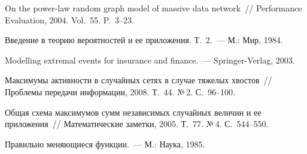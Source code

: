 \begin{multicols}{2}
{{\begin{thebibliography}{9}
     On the power-law random graph model
    of massive data network~// Performance Evaluation, 2004. Vol.~55. P.~3--23.

     Введение в теорию вероятностей и ее приложения. Т.~2.~---
    М.: Мир, 1984.

     Modelling
    extremal events for insurance and finance.~--- Springer-Verlag, 2003.

     Максимумы активности в случайных сетях в
    случае тяжелых хвостов~// Проблемы передачи информации, 2008. Т.~44.
    №\,2. С.~96--100.

 Общая схема максимумов сумм независимых
    случайных величин и ее приложения~// Математические заметки, 2005.
    Т.~77. №\,4. С.~544--550.

\label{end\stat}

 Правильно меняющиеся функции.~--- М.: Наука, 1985.
 \end{thebibliography}
}
}


\end{multicols}       